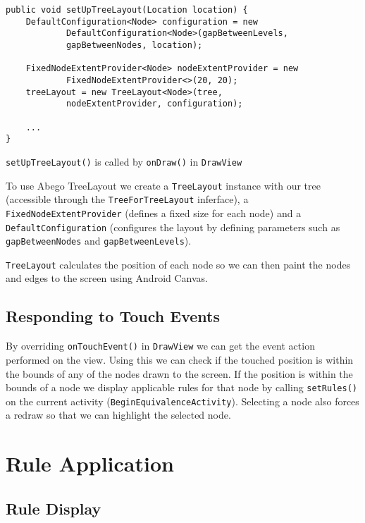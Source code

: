 \documentclass{report}
\begin{document}
\begin{listing}[ht!]
\begin{verbatim}
public void setUpTreeLayout(Location location) {
    DefaultConfiguration<Node> configuration = new 
            DefaultConfiguration<Node>(gapBetweenLevels, 
            gapBetweenNodes, location);

    FixedNodeExtentProvider<Node> nodeExtentProvider = new 
            FixedNodeExtentProvider<>(20, 20);
    treeLayout = new TreeLayout<Node>(tree,
            nodeExtentProvider, configuration);

    ...
}
\end{verbatim}
\caption{{\tt setUpTreeLayout()} is called by {\tt onDraw()} in {\tt DrawView}}
\label{setuptreelayout}
\end{listing}

To use Abego TreeLayout we create a {\tt TreeLayout} instance with our tree (accessible through the {\tt TreeForTreeLayout} inferface), a {\tt FixedNodeExtentProvider} (defines a fixed size for each node) and a {\tt DefaultConfiguration} (configures the layout by defining parameters such as {\tt gapBetweenNodes} and {\tt gapBetweenLevels}).

{\tt TreeLayout} calculates the position of each node so we can then paint the nodes and edges to the screen using Android Canvas.

\subsection{Responding to Touch Events}

By overriding {\tt onTouchEvent()} in {\tt DrawView} we can get the event action performed on the view. Using this we can check if the touched position is within the bounds of any of the nodes drawn to the screen. If the position is within the bounds of a node we display applicable rules for that node by calling {\tt setRules()} on the current activity ({\tt BeginEquivalenceActivity}). Selecting a node also forces a redraw so that we can highlight the selected node.

\section{Rule Application}

\subsection{Rule Display}
\end{document}
